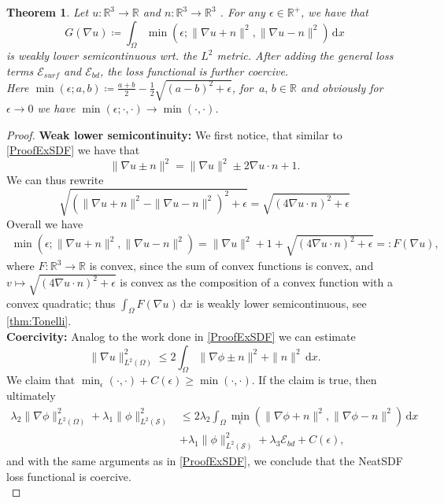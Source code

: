\documentclass[12pt,openany]{book}
\newcommand{\R}{\mathbb{R}}
\def\S{\mathcal{S}}
\theoremstyle{plainnormal}
\newtheorem{theorem}{Theorem}[section]
\theoremstyle{remark}
\begin{document}
\begin{theorem}\label{min_lsc}
    Let $u:\R^3\rightarrow\R$ and $n: \R^3\rightarrow\R^3$ . For any $\epsilon \in \R^+$, we have that $$G(\nabla u) \coloneqq \int_\Omega \min (\epsilon; \|\nabla u+ n\|^2,\|\nabla u - n\|^2)\,\mathrm{d}x$$ is weakly lower semicontinuous wrt.  the $L^2$ metric. After adding the general loss terms $\mathcal{E}_{surf}$ and $\mathcal{E}_{bd}$, the loss functional is further coercive.\\
    Here $\min(\epsilon;a,b) \coloneqq \frac{a + b}{2} - \frac{1}{2}\sqrt{(a-b)^2 + \epsilon}$, for $\,a,\,b \in \R$ and obviously for $\epsilon  \rightarrow 0$ we have $\min(\epsilon; \cdot, \cdot) \rightarrow \min(\cdot, \cdot)$. 
\end{theorem}
\begin{proof}
\textbf{Weak lower semicontinuity:} We first notice, that similar to \cref{ProofExSDF} we have that $$\|\nabla u \pm n\|^2 = \|\nabla u\|^2 \pm 2 \nabla u \cdot n + 1.$$
    We can thus rewrite $$\sqrt{(\|\nabla u + n\|^2 - \|\nabla u - n\|^2)^2 + \epsilon} = \sqrt{(4 \nabla u\cdot n)^2 + \epsilon}$$
    Overall we have \begin{align*}
        \min (\epsilon; \|\nabla u+ n\|^2,\|\nabla u - n\|^2) = \|\nabla u\|^2 + 1 + \sqrt{(4 \nabla u\cdot n)^2 + \epsilon}=: F(\nabla u), 
    \end{align*}
    where $F :\R^3 \rightarrow\R$ is convex, since the sum of convex functions is convex, and $v\mapsto\sqrt{(4 \nabla u\cdot n)^2 + \epsilon}$ is convex as the composition of a convex function with a convex quadratic; thus $\int_\Omega F(\nabla u)\, \mathrm{d}x$ is weakly lower semicontinuous, see \cref{thm:Tonelli}.\\
    \textbf{Coercivity:} Analog to the work done in \cref{ProofExSDF} we can estimate $$\|\nabla u\|^2_{L^2(\Omega)} \leq 2 \int_\Omega \|\nabla \phi \pm n\|^2 + \|n\|^2\,\mathrm{d}x.$$
    We claim that $\min_\epsilon(\cdot, \cdot) + C(\epsilon) \geq \min(\cdot, \cdot)$. If the claim is true, then ultimately 
    \begin{align*}
    \lambda_2\|\nabla \phi\| ^2_{L^2(\Omega)} + \lambda_1 \|\phi\| ^2_{L^2(\S)}
 &\leq 2 \lambda_2\int_\Omega\min_\epsilon(\|\nabla \phi + n\|^2, \|\nabla \phi - n\|^2) \,\mathrm{d}x \\ 
 &+ \lambda_1 \|\phi\| ^2_{L^2(\S)} + \lambda_3 \mathcal{E}_{bd} + C(\epsilon),
\end{align*} 
and with the same arguments as in \cref{ProofExSDF}, we conclude that the NeatSDF loss functional is coercive.\\

\end{proof}
\end{document}
